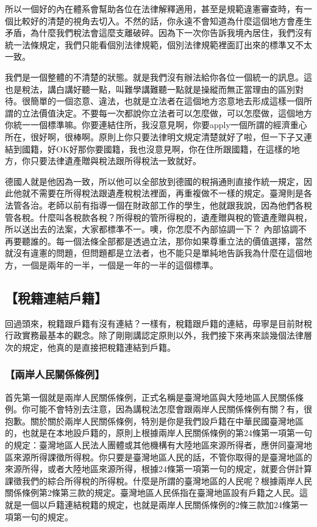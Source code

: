 \documentclass[oneside,sub3section]{ctexbook}
\begin{document}
所以一個好的內在體系會幫助各位在法律解釋適用，甚至是規範違憲審查時，有一個比較好的清楚的視角去切入。不然的話，你永遠不會知道為什麼這個地方會產生矛盾，為什麼我們稅法會這麼支離破碎。因為下一次你告訴我境內居住，我們沒有統一法條規定，我們只能看個別法律規範，個別法律規範裡面訂出來的標準又不太一致。

我們是一個整體的不清楚的狀態。就是我們沒有辦法給你各位一個統一的訊息。這也是稅法，講白講好聽一點，叫難學講難聽一點就是操縱而無正當理由的區別對待。很簡單的一個恣意、違法，也就是立法者在這個地方恣意地去形成這樣一個所謂的立法價值決定。不要每一次都說你立法者可以怎麼做，可以怎麼做，這個地方你統一一個標準嘛。你要連結住所，我沒意見啊，你要apply一個所謂的經濟重心所在，很好啊，很棒啊。原則上你只要法律明文規定清楚就好了啦，但一下子又連結到國籍，好OK好那你要國籍，我也沒意見啊，你在住所跟國籍，在這樣的地方，你只要法律遺產贈與稅法跟所得稅法一致就好。

德國人就是他因為一致，所以他可以全部放到德國的稅捐通則直接作統一規定，因此他就不需要在所得稅法跟遺產稅稅法裡面，再重複做不一樣的規定。臺灣則是各法管各治。老師以前有指導一個在財政部工作的學生，他就跟我說，因為他們各稅管各稅。什麼叫各稅款各稅？所得稅的管所得稅的，遺產贈與稅的管遺產贈與稅，所以送出去的法案，大家都標準不一。噢，你怎麼不內部協調一下？ 內部協調不再要聽誰的。每一個法條全部都是透過立法，那你如果尊重立法的價值選擇，當然就沒有違憲的問題，但問題都是立法者，也不能只是單純地告訴我為什麼在這個地方，一個是兩年的一半，一個是一年的一半的這個標準。

\hypertarget{ux7a05ux7c4dux9023ux7d50ux6236ux7c4d}{%
\subsection{【稅籍連結戶籍】}\label{ux7a05ux7c4dux9023ux7d50ux6236ux7c4d}}

回過頭來，稅籍跟戶籍有沒有連結？一樣有，稅籍跟戶籍的連結，毋寧是目前財稅行政實務最基本的觀念。除了剛剛講認定原則以外，我們接下來再來談幾個法律層次的規定，他真的是直接把稅籍連結到戶籍。

\hypertarget{ux5169ux5cb8ux4ebaux6c11ux95dcux4fc2ux689dux4f8b}{%
\subsubsection{【兩岸人民關係條例】}\label{ux5169ux5cb8ux4ebaux6c11ux95dcux4fc2ux689dux4f8b}}

首先第一個就是兩岸人民關係條例，正式名稱是臺灣地區與大陸地區人民關係條例。你可能不會特別去注意，因為講稅法怎麼會跟兩岸人民關係條例有關？有，很抱歉。關於關於兩岸人民關係條例，特別是你是我們設戶籍在中華民國臺灣地區的，也就是在本地設戶籍的，原則上根據兩岸人民關係條例的第24條第一項第一句的規定：臺灣地區人民法人團體或其他機構有大陸地區來源所得者，應併同臺灣地區來源所得課徵所得稅。你只要是臺灣地區人民的話，不管你取得的是臺灣地區的來源所得，或者大陸地區來源所得，根據24條第一項第一句的規定，就要合併計算課徵我們的綜合所得稅的所得稅。什麼是所謂的臺灣地區的人民呢？根據兩岸人民關係條例第2條第三款的規定。臺灣地區人民係指在臺灣地區設有戶籍之人民。這就是一個以戶籍連結稅籍的規定，也就是兩岸人民關係條例的2條三款加24條第一項第一句的規定。
\end{document}
